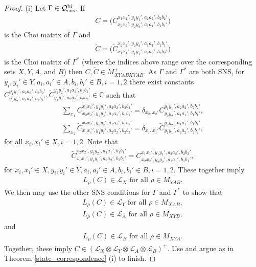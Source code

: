 \documentclass[11pt]{amsart}
\newcommand{\cl}[1]{\mathcal{#1}}
\newcommand{\bb}[1]{\mathbb{#1}}
\begin{document}
\begin{proof}
(i) Let $\Gamma \in \cl{Q}_{\rm sns}^{\rm bi}$. If
\begin{gather*}
	C = \big(C_{x_{2}x_{2}', y_{2}y_{2}', a_{1}a_{1}', b_{1}b_{1}'}^{x_{1}x_{1}', y_{1}y_{1}', a_{2}a_{2}', b_{2}b_{2}'}\big)
\end{gather*}
\noindent is the Choi matrix of $\Gamma$ and
\begin{gather*}
	\tilde{C} = \big(\tilde{C}_{x_{1}x_{1}', y_{1}y_{1}', a_{2}a_{2}', b_{2}b_{2}'}^{x_{2}x_{2}', y_{2}y_{2}', a_{1}a_{1}', b_{1}b_{1}'}\big)
\end{gather*}
\noindent is the Choi matrix of $\Gamma^{*}$ (where the indices above range over the corresponding sets $X, Y, A$, and $B$) then $C, \tilde{C} \in M_{XYABXYAB}^{+}$. As $\Gamma$ and $\Gamma^{*}$ are both SNS, for $y_{i}, y_{i}' \in Y, a_{i}, a_{i}' \in A, b_{i}, b_{i}' \in B, i = 1, 2$ there exist constants $C_{y_{2}y_{2}', a_{1}a_{1}', b_{1}b_{1}'}^{y_{1}y_{1}', a_{2}a_{2}', b_{2}b_{2}'}, \tilde{C}_{y_{1}y_{1}', a_{2}a_{2}', b_{2}b_{2}'}^{y_{2}y_{2}', a_{1}a_{1}', b_{1}b_{1}'} \in \bb{C}$ such that
\begin{gather*}
	\sum\limits_{x_{1}}C_{x_{2}x_{2}', y_{2}y_{2}', a_{1}a_{1}', b_{1}b_{1}'}^{x_{1}x_{1}', y_{1}y_{1}', a_{2}a_{2}', b_{2}b_{2}'} = \delta_{x_{2}, x_{2}'}C_{y_{2}y_{2}', a_{1}a_{1}', b_{1}b_{1}'}^{y_{1}y_{1}', a_{2}a_{2}', b_{2}b_{2}'}, 
\\ 	\sum\limits_{x_{2}}\tilde{C}_{x_{1}x_{1}', y_{1}y_{1}', a_{2}a_{2}', b_{2}b_{2}'}^{x_{2}x_{2}', y_{2}y_{2}', a_{1}a_{1}', b_{1}b_{1}'} = \delta_{x_{1}, x_{1}'}\tilde{C}_{y_{1}y_{1}', a_{2}a_{2}', b_{2}b_{2}'}^{y_{2}y_{2}', a_{1}a_{1}', b_{1}b_{1}'},
\end{gather*}
\noindent for all $x_{i}, x_{i}' \in X, i = 1, 2$. Note that
\begin{gather*}
	\tilde{C}_{x_{1}x_{1}', y_{1}y_{1}', a_{2}a_{2}', b_{2}b_{2}'}^{x_{2}x_{2}', y_{2}y_{2}', a_{1}a_{1}', b_{1}b_{1}'} = C_{x_{2}x_{2}', y_{2}y_{2}', a_{1}a_{1}', b_{1}b_{1}'}^{x_{1}x_{1}', y_{1}y_{1}', a_{2}a_{2}', b_{2}b_{2}'},
\end{gather*}
\noindent for $x_{i}, x_{i}' \in X, y_{i}, y_{i}' \in Y, a_{i}, a_{i}' \in A, b_{i}, b_{i}' \in B, i = 1, 2$. These together imply
\begin{gather*}
	L_{\rho}(C) \in \cl{L}_{X} \text{ for all } \rho \in M_{YAB}.
\end{gather*}
\noindent We then may use the other SNS conditions for $\Gamma$ and $\Gamma^{*}$ to show that
\begin{gather*}
	L_{\rho}(C) \in \cl{L}_{Y} \text{ for all } \rho \in M_{XAB},
\\	L_{\rho}(C) \in \cl{L}_{A} \text{ for all } \rho \in M_{XYB},
\end{gather*}
\noindent and 
\begin{gather*}
	L_{\rho}(C) \in \cl{L}_{B} \text{ for all } \rho \in M_{XYA}.
\end{gather*}
\noindent Together, these imply $C \in (\cl{L}_{X}\otimes \cl{L}_{Y}\otimes \cl{L}_{A}\otimes \cl{L}_{B})^{+}$. Use \cite[Proposition 3.6]{bhtt} and argue as in Theorem \ref{state_correspondence} (i) to finish.


\end{proof}
\end{document}
